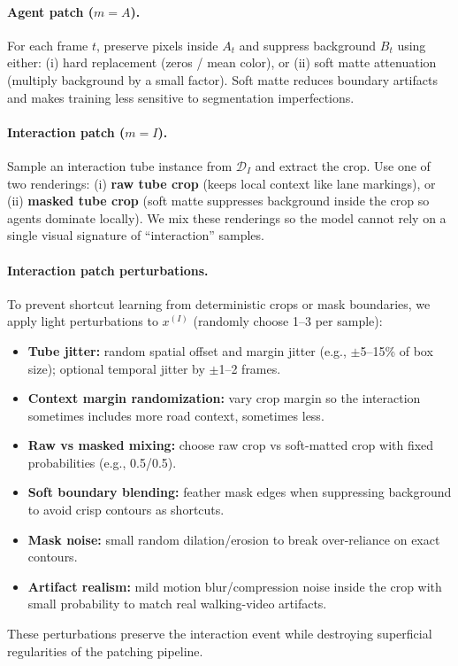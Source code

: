 \paragraph{Agent patch ($m{=}A$).} For each frame $t$, preserve pixels inside $A_t$ and suppress background $B_t$ using either:
(i) hard replacement (zeros / mean color), or
(ii) soft matte attenuation (multiply background by a small factor).
Soft matte reduces boundary artifacts and makes training less sensitive to segmentation imperfections.
\paragraph{Interaction patch ($m{=}I$).} Sample an interaction tube instance from $\mathcal{D}_I$ and extract the crop. Use one of two renderings:
(i) \textbf{raw tube crop} (keeps local context like lane markings), or
(ii) \textbf{masked tube crop} (soft matte suppresses background inside the crop so agents dominate locally).
We mix these renderings so the model cannot rely on a single visual signature of ``interaction'' samples.

\paragraph{Interaction patch perturbations.} To prevent shortcut learning from deterministic crops or mask boundaries, we apply light perturbations to $x^{(I)}$ (randomly choose 1--3 per sample):
\begin{itemize}
  \item \textbf{Tube jitter:} random spatial offset and margin jitter (e.g., $\pm$5--15\% of box size); optional temporal jitter by $\pm$1--2 frames.
  \item \textbf{Context margin randomization:} vary crop margin so the interaction sometimes includes more road context, sometimes less.
  \item \textbf{Raw vs masked mixing:} choose raw crop vs soft-matted crop with fixed probabilities (e.g., 0.5/0.5).
  \item \textbf{Soft boundary blending:} feather mask edges when suppressing background to avoid crisp contours as shortcuts.
  \item \textbf{Mask noise:} small random dilation/erosion to break over-reliance on exact contours.
  \item \textbf{Artifact realism:} mild motion blur/compression noise inside the crop with small probability to match real walking-video artifacts.
\end{itemize}
These perturbations preserve the interaction event while destroying superficial regularities of the patching pipeline.

